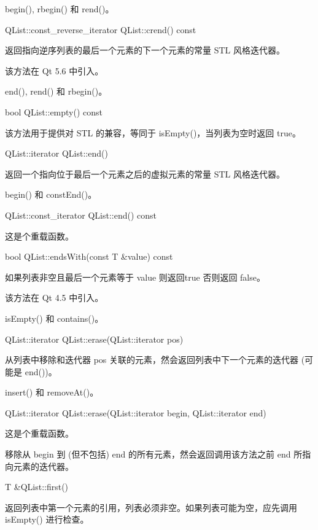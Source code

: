 \begin{seeAlso}
begin(), rbegin() 和 rend()。
\end{seeAlso}

QList::const\_reverse\_iterator QList::crend() const

返回指向逆序列表的最后一个元素的下一个元素的常量 STL 风格迭代器。

该方法在 Qt 5.6 中引入。

\begin{seeAlso}
end(), rend() 和 rbegin()。
\end{seeAlso}

bool QList::empty() const

该方法用于提供对 STL 的兼容，等同于 isEmpty()，当列表为空时返回 true。

QList::iterator QList::end()

返回一个指向位于最后一个元素之后的虚拟元素的常量 STL 风格迭代器。

\begin{seeAlso}
begin() 和 constEnd()。
\end{seeAlso}

QList::const\_iterator QList::end() const

这是个重载函数。

bool QList::endsWith(const T \&value) const

如果列表非空且最后一个元素等于 value 则返回true 否则返回 false。

该方法在 Qt 4.5 中引入。

\begin{seeAlso}
isEmpty() 和 contains()。
\end{seeAlso}

QList::iterator QList::erase(QList::iterator pos)

从列表中移除和迭代器 pos 关联的元素，然会返回列表中下一个元素的迭代器 (可能是 end())。

\begin{seeAlso}
insert() 和 removeAt()。
\end{seeAlso}

QList::iterator QList::erase(QList::iterator begin, QList::iterator end)

这是个重载函数。

移除从 begin 到 (但不包括) end 的所有元素，然会返回调用该方法之前 end
所指向元素的迭代器。

T \&QList::first()

返回列表中第一个元素的引用，列表必须非空。如果列表可能为空，应先调用 isEmpty() 进行检查。

